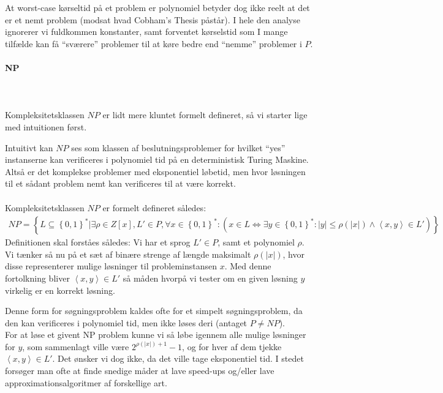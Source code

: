 At worst-case kørseltid på et problem er polynomiel betyder dog ikke reelt at det er et nemt problem (modsat hvad Cobham's Thesis påstår). I hele den analyse ignorerer vi fuldkommen konstanter, samt forventet kørselstid som I mange tilfælde kan få ``sværere'' problemer til at køre bedre end ``nemme'' problemer i $P$.


\paragraph{NP}
~\\
~\\
Kompleksitetsklassen $NP$ er lidt mere kluntet formelt defineret, så vi starter lige med intuitionen først.

Intuitivt kan $NP$ ses som klassen af beslutningsproblemer for hvilket ``yes'' instanserne kan verificeres i polynomiel tid på en deterministisk Turing Maskine. Altså er det komplekse problemer med eksponentiel løbetid, men hvor løsningen til et sådant problem nemt kan verificeres til at være korrekt.\\
~\\
Kompleksitetsklassen $NP$ er formelt defineret således:
\begin{align*}
  NP = \left\lbrace L \subseteq \left\lbrace 0,1 \right\rbrace^* |
    \exists \rho \in Z[x], L' \in P, \forall x \in \left\lbrace 0,1
    \right\rbrace^* : ( x \in L \Leftrightarrow \exists y \in
    \left\lbrace 0,1 \right\rbrace^* : |y| \leq \rho(|x|) \wedge
    \left\langle x,y \right\rangle \in L') \right\rbrace
\end{align*}
Definitionen skal forståes således: Vi har et sprog $L' \in P$, samt et polynomiel $\rho$. Vi tænker så nu på et sæt af binære strenge af længde maksimalt $\rho(|x|)$, hvor disse representerer mulige løsninger til probleminstansen $x$. Med denne fortolkning bliver $\left\langle x,y \right\rangle \in L'$ så måden hvorpå vi tester om en given løsning $y$ virkelig er en korrekt løsning. 

Denne form for søgningsproblem kaldes ofte for et simpelt søgningsproblem, da den kan verificeres i polynomiel tid, men ikke løses deri (antaget $P \neq NP$).\\

For at løse et givent NP problem kunne vi så løbe igennem alle mulige løsninger for $y$, som sammenlagt ville være $2^{\rho(|x|)+1}-1$, og for hver af dem tjekke $\left\langle x,y \right\rangle \in L'$. Det ønsker vi dog ikke, da det ville tage eksponentiel tid. I stedet forsøger man ofte at finde snedige måder at lave speed-ups og/eller lave approximationsalgoritmer af forskellige art.

